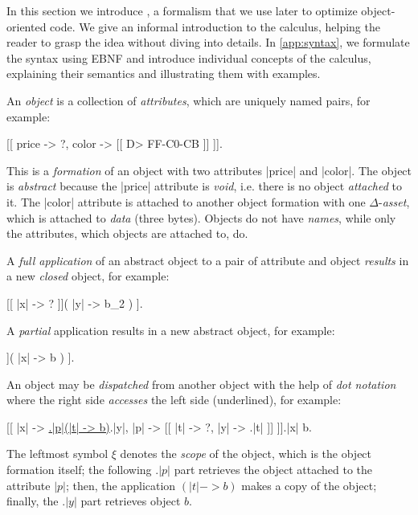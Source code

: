 
In this section we introduce \phic{}, a formalism that we use later to optimize object-oriented code.
We give an informal introduction to the calculus, helping the reader to grasp the idea without diving into details.
In \cref{app:syntax}, we formulate the syntax using EBNF and introduce individual concepts of the calculus, explaining their semantics and illustrating them with examples.

An \emph{object} is a collection of \emph{attributes}, which are uniquely named pairs, for example:
\begin{phiquation}
\label{eq:price-color}
[[ price -> ?, color -> [[ D> FF-C0-CB ]] ]].
\end{phiquation}
This is a \emph{formation} of an object with two attributes |price| and |color|.
The object is \emph{abstract} because the |price| attribute is \emph{void}, i.e. there is no object \emph{attached} to it.
The |color| attribute is attached to another object formation with one \(\Delta\)-\emph{asset}, which is attached to \emph{data} (three bytes).
Objects do not have \emph{names}, while only the attributes, which objects are attached to, do.

A \emph{full application} of an abstract object to a pair of attribute and object \emph{results} in a new \emph{closed} object, for example:
\begin{phiquation}
\label{eq:simple-application}
[[ |x| -> ? ]]( |y| -> b_2 ) \trans [[ |x| -> b_2 ]].
\end{phiquation}
A \emph{partial} application results in a new abstract object, for example:
\begin{phiquation*}
[[ |x| -> ?, |y| -> ? ]]( |x| -> b ) \trans [[ |x| -> b, |y| -> ? ]].
\end{phiquation*}

An object may be \emph{dispatched} from another object with the help of \emph{dot notation} where the right side \emph{accesses} the left side (underlined), for example:
\begin{phiquation}
\label{eq:dot-notation}
[[ |x| -> \underline{\xi.|p|(|t| -> b)}.|y|, |p| -> [[ |t| -> ?, |y| -> \xi.|t| ]] ]].|x| \trans b.
\end{phiquation}
The leftmost symbol \(\xi\) denotes the \emph{scope} of the object,
which is the object formation itself; the following \(.|p|\) part
retrieves the object attached to the attribute \(|p|\);
then, the application $(|t|->b)$ makes a copy of the object;
finally, the \(.|y|\) part retrieves object \(b\).

